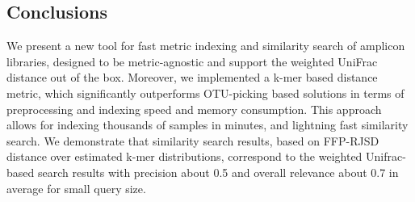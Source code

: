 \documentclass[10pt,letterpaper]{article}
\begin{document}
\subsection*{Conclusions}
We present a new tool for fast metric indexing and similarity search of amplicon libraries, designed to be metric-agnostic and support the weighted UniFrac distance out of the box.
Moreover, we implemented a k-mer based distance metric, which significantly outperforms OTU-picking based solutions in terms of preprocessing and indexing speed and memory consumption.
This approach allows for indexing thousands of samples in minutes, and lightning fast similarity search. 
We demonstrate that similarity search results, based on FFP-RJSD distance over estimated k-mer distributions, correspond to the weighted Unifrac-based search results with precision about 0.5 and overall relevance about 0.7 in average for small query size.


\end{document}
